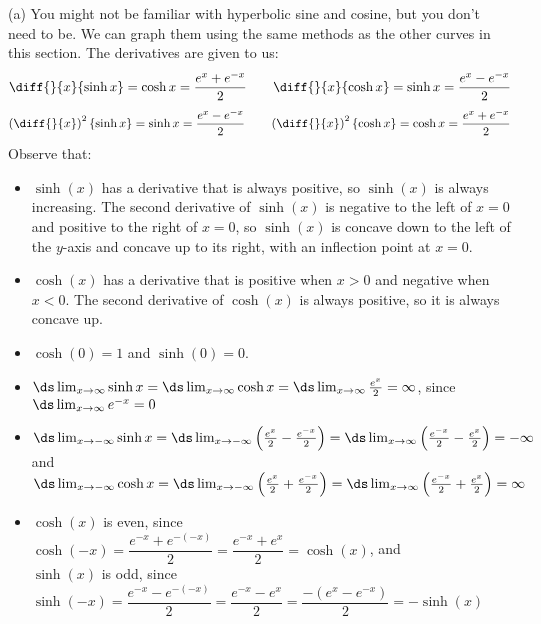 \begin{solution}

 (a)
 You might not be familiar with hyperbolic sine and cosine, but you don't need to be. We can graph them using  the same methods as the other curves in this section. The derivatives are given to us:
 \[\diff{}{x}\{\sinh x\}=\cosh x =\frac{e^x+e^{-x}}{2}\qquad\diff{}{x}\{\cosh x\}=\sinh x = \frac{e^x-e^{-x}}{2}\]
 \[\left(\diff{}{x}\right)^2\{\sinh x\}=\sinh x =\frac{e^x-e^{-x}}{2}\qquad
 \left(\diff{}{x}\right)^2\{\cosh x\}=\cosh x = \frac{e^x+e^{-x}}{2}\]
  Observe that:
 \begin{itemize}
 \item $\sinh(x)$ has a derivative that is always positive, so $\sinh(x)$ is always increasing. The second derivative of $\sinh(x)$ is negative to the left of $x=0$ and positive to the right of $x=0$, so $\sinh(x)$ is concave down to the left of the $y$-axis and concave up to its right, with an inflection point at $x=0$.
  \item $\cosh(x)$ has a derivative that is positive when $x>0$ and negative when $x<0$. The second derivative of $\cosh(x)$ is always positive, so it is always concave up.
\item $\cosh(0)=1$ and $\sinh(0)=0$.
\item
 $\ds\lim_{x\rightarrow\infty}\sinh x = \ds\lim_{x\rightarrow\infty}\cosh x
 =\ds\lim_{x\rightarrow\infty}\frac{e^x}{2}=\infty$, since $\ds\lim_{x \to \infty}e^{-x}=0$
\item
$\ds\lim_{x \to -\infty}\sinh x =\ds\lim_{x \to -\infty}\left(\frac{e^x}{2}-\frac{e^{-x}}{2}\right)
=\ds\lim_{x \to \infty}\left(\frac{e^{-x}}{2}-\frac{e^x}{2}\right)=-\infty
$ and\\
$\ds\lim_{x \to -\infty}\cosh x =\ds\lim_{x \to -\infty}\left(\frac{e^x}{2}+\frac{e^{-x}}{2}\right)
=\ds\lim_{x \to \infty}\left(\frac{e^{-x}}{2}+\frac{e^x}{2}\right)=\infty
$
\item $\cosh(x)$ is even, since $\cosh(-x)=\dfrac{e^{-x}+e^{-(-x)}}{2}=\dfrac{e^{-x}+e^x}{2}=\cosh (x)$, and\\
$\sinh (x)$ is odd, since $\sinh(-x)=\dfrac{e^{-x}-e^{-(-x)}}{2}=\dfrac{e^{-x}-e^x}{2}=\dfrac{-\left(e^x-e^{-x}\right)}{2}=-\sinh(x)$
\end{itemize}

\begin{center}
\end{center}



\end{solution}
